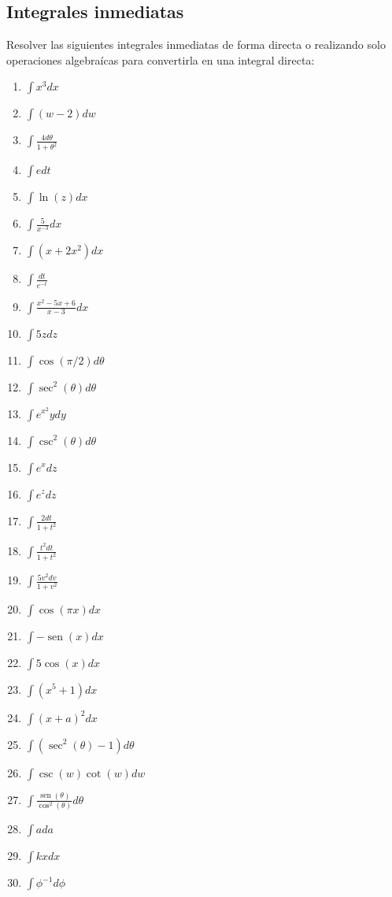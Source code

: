 \documentclass{article}
\begin{document}
\begin{multicols}{2}
\section*{Integrales inmediatas}
Resolver las siguientes integrales inmediatas de forma directa o realizando solo operaciones algebraícas para convertirla en una integral directa:


\begin{enumerate}
    \item $\displaystyle \int x^3 dx$
    \item $\displaystyle \int (w-2) dw$
    \item $\displaystyle \int \frac{4 d\theta}{1 + \theta^2}$
    \item $\displaystyle \int e dt$
    \item $\displaystyle \int \ln (z) dx$
    \item $\displaystyle \int \frac{5}{x^{-3}} dx$
    \item $\displaystyle \int (x + 2x^2) dx$
    \item $\displaystyle \int \frac{dt}{e^{-t}}$
    \item $\displaystyle \int \frac{x^2 - 5x + 6}{x - 3} dx$
    \item $\displaystyle \int 5z dz$
    \item $\displaystyle \int \cos (\pi/2) d\theta$
    \item $\displaystyle \int \sec^2 (\theta) d\theta$
    \item $\displaystyle \int e^{x^2} y dy$
    
    \item $\displaystyle \int \csc ^2 (\theta) d\theta$
    \item $\displaystyle \int e^x dz$
    \item $\displaystyle \int e^z dz$
    \item $\displaystyle \int \frac{2 dt}{1 + t^2}$
    \item $\displaystyle \int \frac{t^2 dt}{1 + t^2}$
    \item $\displaystyle \int \frac{5v^2 dv}{1 + v^2}$
    \item $\displaystyle \int \cos (\pi x) dx$
    \item $\displaystyle \int -\operatorname{sen} (x) dx$
    \item $\displaystyle \int 5 \cos (x) dx$
    \item $\displaystyle \int (x^5 + 1) dx$
    \item $\displaystyle \int (x + a)^2 dx$
    \item $\displaystyle \int (\sec^2 (\theta) - 1) d\theta$
    \item $\displaystyle \int \csc (w) \cot (w) dw$
    \item $\displaystyle \int \frac{\operatorname{sen} (\theta)}{\cos^2 (\theta)} d\theta$
    \item $\displaystyle \int a da$
    \item $\displaystyle \int kx dx$
    \item $\displaystyle \int \phi^{-1} d\phi$
\end{enumerate}


\end{multicols}
\end{document}
